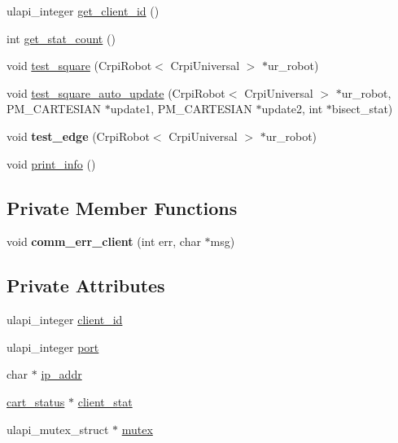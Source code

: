 \begin{DoxyCompactItemize}
\item 
ulapi\+\_\+integer \mbox{\hyperlink{classcart__comm__client_ae7aa5e3ce2b4192163d24fee40191411}{get\+\_\+client\+\_\+id}} ()
\item 
int \mbox{\hyperlink{classcart__comm__client_af857bf6da9431c0ebfa1862bf54ba912}{get\+\_\+stat\+\_\+count}} ()
\item 
void \mbox{\hyperlink{classcart__comm__client_a0b5e6c07fa231bc4c1475934d90775fe}{test\+\_\+square}} (Crpi\+Robot$<$ Crpi\+Universal $>$ $\ast$ur\+\_\+robot)
\item 
void \mbox{\hyperlink{classcart__comm__client_aaa588482b9a7b89a473bd88125aa833a}{test\+\_\+square\+\_\+auto\+\_\+update}} (Crpi\+Robot$<$ Crpi\+Universal $>$ $\ast$ur\+\_\+robot, P\+M\+\_\+\+C\+A\+R\+T\+E\+S\+I\+AN $\ast$update1, P\+M\+\_\+\+C\+A\+R\+T\+E\+S\+I\+AN $\ast$update2, int $\ast$bisect\+\_\+stat)
\item 
\mbox{\label{classcart__comm__client_afbb6d5ec314d688c411a84e24eb0b437}} 
void {\bfseries test\+\_\+edge} (Crpi\+Robot$<$ Crpi\+Universal $>$ $\ast$ur\+\_\+robot)
\item 
void \mbox{\hyperlink{classcart__comm__client_a1b98c6cdf26eea214854b6eec41486a8}{print\+\_\+info}} ()
\end{DoxyCompactItemize}
\subsection*{Private Member Functions}
\begin{DoxyCompactItemize}
\item 
\mbox{\label{classcart__comm__client_a07a9030a40b9d387f3c1a0eb7dffe7fe}} 
void {\bfseries comm\+\_\+err\+\_\+client} (int err, char $\ast$msg)
\end{DoxyCompactItemize}
\subsection*{Private Attributes}
\begin{DoxyCompactItemize}
\item 
ulapi\+\_\+integer \mbox{\hyperlink{classcart__comm__client_a40e8d8cb8282a11b418a63a777d8e975}{client\+\_\+id}}
\item 
ulapi\+\_\+integer \mbox{\hyperlink{classcart__comm__client_ab7aaa2b3805ad44d18c97a094ef705d3}{port}}
\item 
char $\ast$ \mbox{\hyperlink{classcart__comm__client_a4be5bd4f9f71038a43ec454d8370583a}{ip\+\_\+addr}}
\item 
\mbox{\hyperlink{classcart__status}{cart\+\_\+status}} $\ast$ \mbox{\hyperlink{classcart__comm__client_abaecd6fff514a7e5897f45ec7c9815c9}{client\+\_\+stat}}
\item 
ulapi\+\_\+mutex\+\_\+struct $\ast$ \mbox{\hyperlink{classcart__comm__client_a7829aa94a950b37a2d003f11761e269d}{mutex}}
\end{DoxyCompactItemize}


